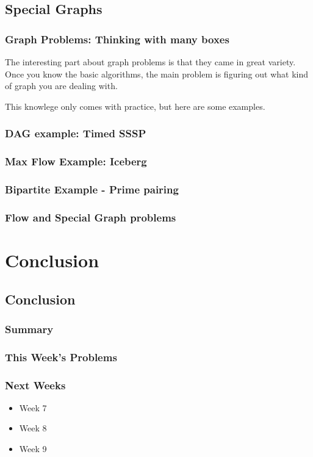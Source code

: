 \documentclass{beamer}
\begin{document}
\subsection{Special Graphs}

\begin{frame}
  \frametitle{Graph Problems: Thinking with many boxes} 

  The interesting part about graph problems is that they came in great
  variety. Once you know the basic algorithms, the main problem is figuring
  out what kind of graph you are dealing with.

  This knowlege only comes with practice, but here are some examples.
\end{frame}

\begin{frame}
  \frametitle{DAG example: Timed SSSP}
\end{frame}

\begin{frame}
  \frametitle{Max Flow Example: Iceberg}
\end{frame}

\begin{frame}
  \frametitle{Bipartite Example - Prime pairing}
\end{frame}

\begin{frame}
  \frametitle{Flow and Special Graph problems}
\end{frame}

\section{Conclusion}
\subsection{Conclusion}
\begin{frame}
  \frametitle{Summary}
\end{frame}

\begin{frame}
  \frametitle{This Week's Problems}
\end{frame}

\begin{frame}
  \frametitle{Next Weeks}
  \begin{itemize}
  \item Week 7
  \item Week 8
  \item Week 9
  \end{itemize}
\end{frame}
\end{document}
